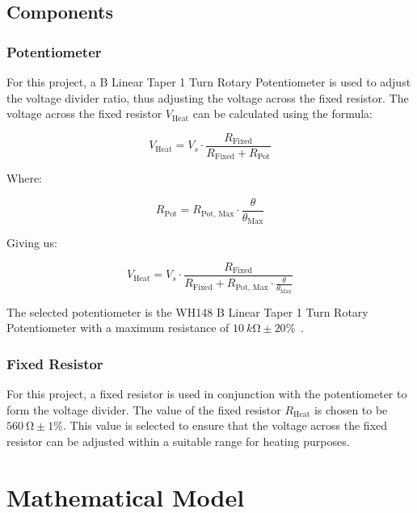 \documentclass[12pt,a4paper]{article}
\begin{document}
\subsection{Components}
\subsubsection{Potentiometer}
For this project, a B Linear Taper 1 Turn Rotary Potentiometer is used to adjust the voltage divider ratio, thus adjusting the voltage across the fixed resistor. The voltage across the fixed resistor $V_{\text{Heat}}$ can be calculated using the formula:

\begin{equation*}
    V_{\text{Heat}} = V_s \cdot \frac{R_{\text{Fixed}}}{R_{\text{Fixed}} + R_{\text{Pot}}}
\end{equation*}

Where:

\begin{equation*}
    R_{\text{Pot}} = R_{\text{Pot, Max}} \cdot \frac{\theta}{\theta_{\text{Max}}}
\end{equation*}

Giving us:

\begin{equation}
    \label{eq:v-heat-theta}
    V_{\text{Heat}} = V_s \cdot \frac{R_{\text{Fixed}}}{R_{\text{Fixed}} + R_{\text{Pot, Max}} \cdot \frac{\theta}{\theta_{\text{Max}}}}
\end{equation}

The selected potentiometer is the WH148 B Linear Taper 1 Turn Rotary Potentiometer with a maximum resistance of $\SI{10}{k\ohm}\pm 20\%$~\cite{potentiometer}.

\subsubsection{Fixed Resistor}
For this project, a fixed resistor is used in conjunction with the potentiometer to form the voltage divider. The value of the fixed resistor $R_{\text{Heat}}$ is chosen to be $\SI{560}{\ohm}\pm 1\%$. This value is selected to ensure that the voltage across the fixed resistor can be adjusted within a suitable range for heating purposes.

\section{Mathematical Model}
\end{document}

